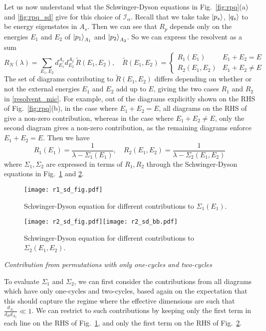 \documentclass[a4paper,11pt]{article}
\newcommand{\be}{\begin{equation}}
\newcommand{\ee}{\end{equation}}
\newcommand\al{{\alpha}}
\newcommand\sI{{\ensuremath{{\mathcal I}}}}
\begin{document}
\begin{enumerate}
\begin{appendix}
Let us now understand what the Schwinger-Dyson equations in Fig.~\ref{fig:rpq}(a) and \ref{fig:rpq_sd} give for this choice of $\sI_{\al}$. Recall that we take take $\ket{p_s}$, $\ket{q_s}$ to be energy eigenstates in $A_s$. Then we can see that $R_p$ depends only on the energies $E_1$ and $E_2$ of $\ket{p_1}_{A_1}$ and $\ket{p_2}_{A_2}$. So we can express the resolvent as a sum 
\be \label{resolvent_mic}
R_N(\lambda) = \sum_{E_1, E_2} d^{A_1}_{E_1} d^{A_2}_{E_2} \, \tilde{R}(E_1, E_2), \quad \tilde{R}(E_1, E_2) = \begin{cases} 
R_1(E_1) & E_1 + E_2 = E\\ 
R_2(E_1, E_2) & E_1 + E_2 \neq E
\end{cases} 
\ee
The set of diagrams contributing to $\tilde{R}(E_1, E_2)$ differs depending on whether or not the external energies $E_1$ and $E_2$ add up to $E$, giving the two cases $R_1$ and $R_2$ in \eqref{resolvent_mic}. For example, out of the diagrams explicitly shown on the RHS of Fig.~\ref{fig:rpq}(b), in the case where $E_1 + E_2=E$, all diagrams on the RHS of give a non-zero contribution, whereas in the case where $E_1 + E_2\neq E$, only the second diagram gives a non-zero contribution, as the remaining diagrams enforce $E_1 + E_2=E$. Then we have 
\be 
R_1(E_1) = \frac{1}{\lambda - \Sigma_1(E_1)}, \quad R_2(E_1, E_2) = \frac{1}{\lambda - \Sigma_2(E_1, E_2)} \label{geom}
\ee 
where $\Sigma_1, \Sigma_2$ are expressed in terms of $R_1, R_2$ through the Schwinger-Dyson equations in Fig.~\ref{fig:r1_sd} and \ref{fig:r2_sd}. 
\begin{figure}[]
\centering 
\texttt{[image: r1\_sd\_fig.pdf]}
\caption{Schwinger-Dyson equation for different contributions to $\Sigma_1(E_1)$.}
\label{fig:r1_sd}
\end{figure} 
\begin{figure}[]
\centering 
\texttt{[image: r2\_sd\_fig.pdf]}\texttt{[image: r2\_sd\_bb.pdf]}
\caption{Schwinger-Dyson equation for different contributions to $\Sigma_2(E_1, E_2)$.}
\label{fig:r2_sd}
\end{figure} 



\noindent \textit{Contribution from permutations with only one-cycles and two-cycles}

To evaluate $\Sigma_1$ and $\Sigma_2$, we can first consider the contributions from all diagrams which have only one-cycles and two-cycles, based again on the expectation that this should capture the regime where the effective dimensions are such that $\frac{d_{A_1}}{d_B d_{A_2}}\ll 1$. We can restrict to such contributions by keeping only the first term in each line on the RHS of Fig.~\ref{fig:r1_sd}, and only the first term on the RHS of Fig.~\ref{fig:r2_sd}. 


\end{appendix}
\end{enumerate}
\end{document}

